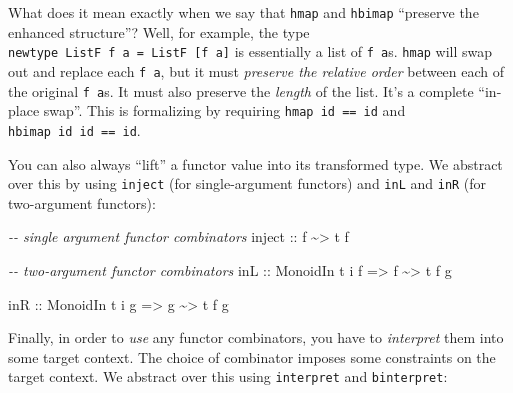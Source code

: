 \documentclass[]{article}
\newenvironment{Shaded}{}{}
\newcommand{\CommentTok}[1]{\textcolor[rgb]{0.38,0.63,0.69}{\textit{#1}}}
\newcommand{\DataTypeTok}[1]{\textcolor[rgb]{0.56,0.13,0.00}{#1}}
\newcommand{\NormalTok}[1]{#1}
\newcommand{\OperatorTok}[1]{\textcolor[rgb]{0.40,0.40,0.40}{#1}}
\newcommand{\OtherTok}[1]{\textcolor[rgb]{0.00,0.44,0.13}{#1}}
\begin{document}
What does it mean exactly when we say that \texttt{hmap} and \texttt{hbimap}
``preserve the enhanced structure''? Well, for example, the type
\texttt{newtype\ ListF\ f\ a\ =\ ListF\ {[}f\ a{]}} is essentially a list of
\texttt{f\ a}s. \texttt{hmap} will swap out and replace each \texttt{f\ a}, but
it must \emph{preserve the relative order} between each of the original
\texttt{f\ a}s. It must also preserve the \emph{length} of the list. It's a
complete ``in-place swap''. This is formalizing by requiring
\texttt{hmap\ id\ ==\ id} and \texttt{hbimap\ id\ id\ ==\ id}.

You can also always ``lift'' a functor value into its transformed type. We
abstract over this by using \texttt{inject} (for single-argument functors) and
\texttt{inL} and \texttt{inR} (for two-argument functors):

\begin{Shaded}
\begin{Highlighting}[]
\CommentTok{{-}{-} single argument functor combinators}
\OtherTok{inject ::}\NormalTok{ f }\OperatorTok{\textasciitilde{}\textgreater{}}\NormalTok{ t f}

\CommentTok{{-}{-} two{-}argument functor combinators}
\OtherTok{inL ::} \DataTypeTok{MonoidIn}\NormalTok{ t i f}
    \OtherTok{=\textgreater{}}\NormalTok{ f }\OperatorTok{\textasciitilde{}\textgreater{}}\NormalTok{ t f g}

\OtherTok{inR ::} \DataTypeTok{MonoidIn}\NormalTok{ t i g}
    \OtherTok{=\textgreater{}}\NormalTok{ g }\OperatorTok{\textasciitilde{}\textgreater{}}\NormalTok{ t f g}
\end{Highlighting}
\end{Shaded}

Finally, in order to \emph{use} any functor combinators, you have to
\emph{interpret} them into some target context. The choice of combinator imposes
some constraints on the target context. We abstract over this using
\texttt{interpret} and \texttt{binterpret}:
\end{document}
